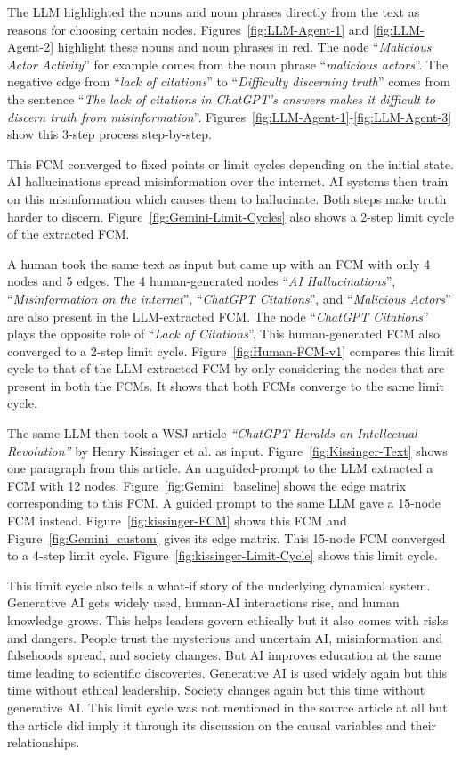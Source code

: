 \documentclass[runningheads]{llncs}
\begin{document}
The LLM highlighted the nouns and noun phrases directly from the text as reasons for choosing certain nodes. 
Figures~\ref{fig:LLM-Agent-1} and \ref{fig:LLM-Agent-2} highlight these nouns and noun phrases in red. 
The node ``{\emph{Malicious Actor Activity}}'' for example comes from the noun phrase ``\emph{malicious actors}''. 
The negative edge from ``\emph{lack of citations}'' to ``\emph{Difficulty discerning truth}'' comes from the sentence ``\emph{The lack of citations in ChatGPT's answers makes it difficult to discern truth from misinformation}''. 
Figures~\ref{fig:LLM-Agent-1}-\ref{fig:LLM-Agent-3} show this 3-step process step-by-step. 


This FCM converged to fixed points or limit cycles depending on the initial state. 
AI hallucinations spread misinformation over the internet. 
AI systems then train on this misinformation which causes them to hallucinate. 
Both steps make truth harder to discern.  
Figure~\ref{fig:Gemini-Limit-Cycles} also shows a 2-step limit cycle of the extracted FCM.

A human took the same text as input but came up with an FCM with only 4 nodes and 5 edges. 
The 4 human-generated nodes ``{\emph{AI Hallucinations}}'', ``{\emph{Misinformation on the internet}}'', ``{\emph{ChatGPT Citations}}'', and ``{\emph{Malicious Actors}}'' are also present in the LLM-extracted FCM. 
The node ``{\emph{ChatGPT Citations}}'' plays the opposite role of ``{\emph{Lack of Citations}}''. 
This human-generated FCM also converged to a 2-step limit cycle. 
Figure~\ref{fig:Human-FCM-v1} compares this limit cycle to that of the LLM-extracted FCM by only considering the nodes that are present in both the FCMs. 
It shows that both FCMs converge to the same limit cycle. 

The same LLM then took a WSJ article \emph{``ChatGPT Heralds an Intellectual Revolution''} by Henry Kissinger et al. as input. 
Figure~\ref{fig:Kissinger-Text} shows one paragraph from this article.
An unguided-prompt to the LLM extracted a FCM with 12 nodes. Figure~\ref{fig:Gemini_baseline} shows the edge matrix corresponding to this FCM. 
A guided prompt to the same LLM gave a 15-node FCM instead.
Figure~\ref{fig:kissinger-FCM} shows this FCM and Figure~\ref{fig:Gemini_custom} gives its edge matrix. 
This 15-node FCM converged to a 4-step limit cycle. 
Figure~\ref{fig:kissinger-Limit-Cycle} shows this limit cycle. 

This limit cycle also tells a what-if story of the underlying dynamical system. 
Generative AI gets widely used, human-AI interactions rise, and human knowledge grows. 
This helps leaders govern ethically but it also comes with risks and dangers.
People trust the mysterious and uncertain AI, misinformation and falsehoods spread, and society changes. 
But AI improves education at the same time leading to scientific discoveries. 
Generative AI is used widely again but this time without ethical leadership. 
Society changes again but this time without generative AI. 
This limit cycle was not mentioned in the source article at all but the article did imply it through its discussion on the causal variables and their relationships.
\end{document}
